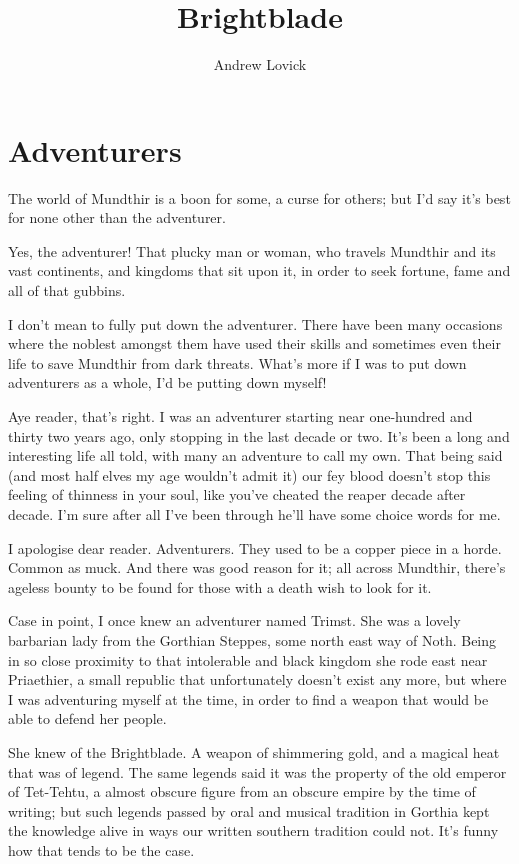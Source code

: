 \documentclass[12pt, a4paper]{book}
\title{Brightblade}
\author{Andrew Lovick}
\date{}
\begin{document}
\maketitle
\clearpage
\tableofcontents
\printindex
\clearpage


\chapter{Adventurers}
The world of Mundthir is a boon for some, a curse for others; but I'd say it's best for none other than the adventurer. 

Yes, the adventurer! That plucky man or woman, who travels Mundthir and its vast continents, and kingdoms that sit upon it, in order to seek fortune, fame and all of that gubbins.

I don't mean to fully put down the adventurer. There have been many occasions where the noblest amongst them have used their skills and sometimes even their life to save Mundthir from dark threats. What's more if I was to put down adventurers as a whole, I'd be putting down myself!

Aye reader, that's right. I was an adventurer starting near one-hundred and thirty two years ago, only stopping in the last decade or two. It's been a long and interesting life all told, with many an adventure to call my own. That being said (and most half elves my age wouldn't admit it) our fey blood doesn't stop this feeling of thinness in your soul, like you've cheated the reaper decade after decade. I'm sure after all I've been through he'll have some choice words for me.

I apologise dear reader. Adventurers. They used to be a copper piece in a horde. Common as muck. And there was good reason for it; all across Mundthir, there's ageless bounty to be found for those with a death wish to look for it. 

Case in point, I once knew an adventurer named Trimst. She was a lovely barbarian lady from the Gorthian Steppes, some north east way of Noth. Being in so close proximity to that intolerable and black kingdom she rode east near Priaethier, a small republic that unfortunately doesn't exist any more, but where I was adventuring myself at the time, in order to find a weapon that would be able to defend her people.

She knew of the Brightblade. A weapon of shimmering gold, and a magical heat that was of legend. The same legends said it was the property of the old emperor of Tet-Tehtu, a almost obscure figure from an obscure empire by the time of writing; but such legends passed by oral and musical tradition in Gorthia kept the knowledge alive in ways our written southern tradition could not. It's funny how that tends to be the case.
\end{document}
